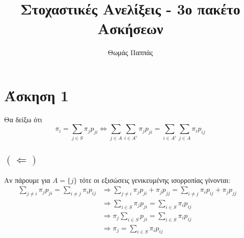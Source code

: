 \documentclass[a4paper,11pt]{article}
\begin{document}
\title{Στοχαστικές Ανελίξεις - 3ο πακέτο Ασκήσεων}
\author{Θωμάς Παππάς}
\date{}
\maketitle

\section*{Άσκηση 1}

Θα δείξω ότι
\[
	\pi_i = \sum_{j\in S} \pi_j p_{ji} \Leftrightarrow
	\sum_{j\in A} \sum_{i\in A^c} \pi_j p_{ji} = \sum_{i\in A^c} \sum_{j\in A} \pi_i p_{ij}
\]

\subsection*{$(\Leftarrow)$}
Αν πάρουμε για $A = \{j\}$ τότε οι εξισώσεις γενικευμένης ισορροπίας γίνονται:
\begin{align*}
	\sum_{j\neq i} \pi_j p_{ji} = \sum_{i\neq j} \pi_i p_{ij}
		&\Rightarrow \sum_{j\neq i} \pi_j p_{ji} + \pi_j p_{jj} = \sum_{i\neq j} \pi_i p_{ij} + \pi_j p_{jj} &\\
		&\Rightarrow \sum_{i\in S} \pi_j p_{ji} = \sum_{i\in S} \pi_i p_{ij}\\
		&\Rightarrow \pi_j \sum_{i\in S} p_{ji} = \sum_{i\in S} \pi_i p_{ij}\\
		&\Rightarrow \pi_j = \sum_{i\in S} \pi_i p_{ij}
\end{align*}
\end{document}

